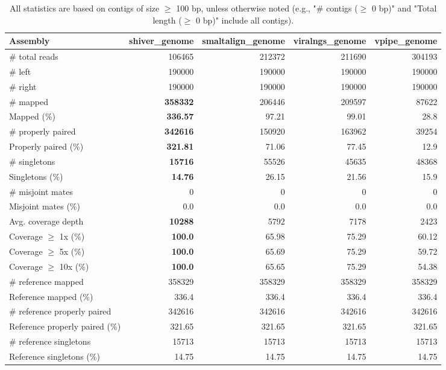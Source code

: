 \documentclass[12pt,a4paper]{article}
\begin{document}
\begin{table}[ht]
\begin{center}
\caption{All statistics are based on contigs of size $\geq$ 100 bp, unless otherwise noted (e.g., "\# contigs ($\geq$ 0 bp)" and "Total length ($\geq$ 0 bp)" include all contigs).}
\begin{tabular}{|l*{4}{|r}|}
\hline
Assembly & shiver\_genome & smaltalign\_genome & viralngs\_genome & vpipe\_genome \\ \hline
\# total reads & 106465 & 212372 & 211690 & 304193 \\ \hline
\# left & 190000 & 190000 & 190000 & 190000 \\ \hline
\# right & 190000 & 190000 & 190000 & 190000 \\ \hline
\# mapped & {\bf 358332} & 206446 & 209597 & 87622 \\ \hline
Mapped (\%) & {\bf 336.57} & 97.21 & 99.01 & 28.8 \\ \hline
\# properly paired & {\bf 342616} & 150920 & 163962 & 39254 \\ \hline
Properly paired (\%) & {\bf 321.81} & 71.06 & 77.45 & 12.9 \\ \hline
\# singletons & {\bf 15716} & 55526 & 45635 & 48368 \\ \hline
Singletons (\%) & {\bf 14.76} & 26.15 & 21.56 & 15.9 \\ \hline
\# misjoint mates & 0 & 0 & 0 & 0 \\ \hline
Misjoint mates (\%) & 0.0 & 0.0 & 0.0 & 0.0 \\ \hline
Avg. coverage depth & {\bf 10288} & 5792 & 7178 & 2423 \\ \hline
Coverage $\geq$ 1x (\%) & {\bf 100.0} & 65.98 & 75.29 & 60.12 \\ \hline
Coverage $\geq$ 5x (\%) & {\bf 100.0} & 65.69 & 75.29 & 59.72 \\ \hline
Coverage $\geq$ 10x (\%) & {\bf 100.0} & 65.65 & 75.29 & 54.38 \\ \hline
\# reference mapped & 358329 & 358329 & 358329 & 358329 \\ \hline
Reference mapped (\%) & 336.4 & 336.4 & 336.4 & 336.4 \\ \hline
\# reference properly paired & 342616 & 342616 & 342616 & 342616 \\ \hline
Reference properly paired (\%) & 321.65 & 321.65 & 321.65 & 321.65 \\ \hline
\# reference singletons & 15713 & 15713 & 15713 & 15713 \\ \hline
Reference singletons (\%) & 14.75 & 14.75 & 14.75 & 14.75 \\ \hline

\end{tabular}
\end{center}
\end{table}
\end{document}
